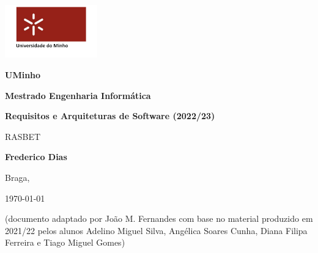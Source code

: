 \begin{titlepage}
	\centering
	\includegraphics[width=0.3\textwidth]{imagens/capa/uminho.png}\par\vspace{1cm}
	{\huge\bf UMinho\par}
	\vspace{0.5cm}
	{\huge\bf Mestrado Engenharia Informática\par}
	\vspace{0.1cm}
	{\huge\bf Requisitos e Arquiteturas de Software (2022/23)\par}
	\vspace{3cm}
    {\scshape\LARGE  \par}
    \vspace{0.5cm}
    {\scshape\Huge  RASBET\par}
	\vspace{2.5cm}
    
    \textbf{Frederico Dias}
    
	\vspace{5.5cm}
    \large Braga, {\large \today\par}
    
    \vfill 
    
    {\small (documento adaptado por João M. Fernandes com base no material produzido em 2021/22 pelos alunos Adelino Miguel Silva, Angélica Soares Cunha, Diana Filipa Ferreira e Tiago Miguel Gomes)}
\end{titlepage}


